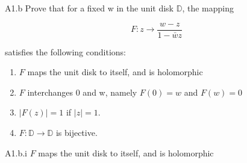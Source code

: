 \documentclass{article}
\begin{document}
\begin{PROB}{A1.b}\label{Problem A1.b.}
    Prove that for a fixed w in the unit disk $\mathbb{D}$, the mapping

    \[F: z \to \frac{w - z}{1 - \bar{w}z}\]

    satisfies the following conditions:

    \begin{enumerate}
        \item $F$ maps the unit disk to itself, and is holomorphic
        \item $F$ interchanges 0 and w, namely $F(0) = w$ and $F(w) = 0$
        \item $|F(z)| = 1$ if $|z| = 1$.
        \item $F: \mathbb{D} \to \mathbb{D}$ is bijective. 
    \end{enumerate}
\end{PROB}
\begin{claim}{A1.b.i}\label{Claim 3bi.}
    $F$ maps the unit disk to itself, and is holomorphic
\end{claim}
\end{document}
